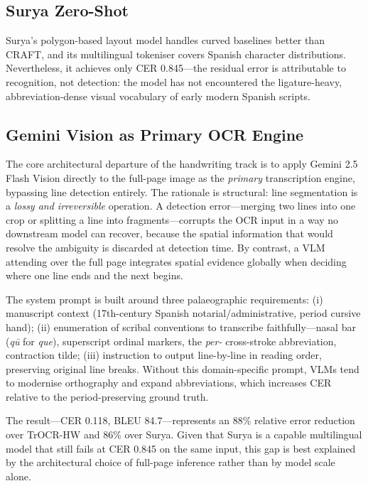 \documentclass[11pt,a4paper]{article}
\begin{document}
\subsection{Surya Zero-Shot}

Surya's polygon-based layout model handles curved baselines better than CRAFT, and its
multilingual tokeniser covers Spanish character distributions. Nevertheless, it achieves
only CER 0.845---the residual error is attributable to recognition, not detection: the model
has not encountered the ligature-heavy, abbreviation-dense visual vocabulary of early modern
Spanish scripts.

\subsection{Gemini Vision as Primary OCR Engine}

The core architectural departure of the handwriting track is to apply Gemini 2.5 Flash
Vision directly to the full-page image as the \emph{primary} transcription engine, bypassing
line detection entirely. The rationale is structural: line segmentation is a
\emph{lossy and irreversible} operation. A detection error---merging two lines into one crop
or splitting a line into fragments---corrupts the OCR input in a way no downstream model
can recover, because the spatial information that would resolve the ambiguity is discarded
at detection time. By contrast, a VLM attending over the full page integrates spatial
evidence globally when deciding where one line ends and the next begins.

The system prompt is built around three palaeographic requirements: (i) manuscript
context (17th-century Spanish notarial/administrative, period cursive hand); (ii) enumeration
of scribal conventions to transcribe faithfully---nasal bar (\textit{q\={u}} for \textit{que}),
superscript ordinal markers, the \textit{per-} cross-stroke abbreviation, contraction tilde;
(iii) instruction to output line-by-line in reading order, preserving original line breaks.
Without this domain-specific prompt, VLMs tend to modernise orthography and expand abbreviations,
which increases CER relative to the period-preserving ground truth.

The result---CER 0.118, BLEU 84.7---represents an 88\% relative error reduction over
TrOCR-HW and 86\% over Surya. Given that Surya is a capable multilingual model that
still fails at CER 0.845 on the same input, this gap is best explained by the architectural
choice of full-page inference rather than by model scale alone.
\end{document}
